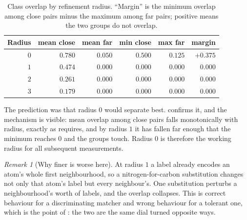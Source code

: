 \documentclass[11pt,twocolumn,a4paper]{article}
\theoremstyle{scthm}
\theoremstyle{definition}
\theoremstyle{remark}
\newtheorem{remark}[theorem]{Remark}
\begin{document}
\begin{table}[htbp]
\centering\small
\caption{Class overlap by refinement radius. ``Margin'' is the minimum
overlap among \textsf{close} pairs minus the maximum among \textsf{far}
pairs; positive means the two groups do not overlap.}
\label{tab:sweep}
\begin{tabular}{@{}rrrrrr@{}}
\toprule
Radius & mean close & mean far & min close & max far & margin\\
\midrule
$0$ & $0.780$ & $0.050$ & $0.500$ & $0.125$ & $+0.375$\\
$1$ & $0.474$ & $0.000$ & $0.000$ & $0.000$ & $\phantom{+}0.000$\\
$2$ & $0.261$ & $0.000$ & $0.000$ & $0.000$ & $\phantom{+}0.000$\\
$3$ & $0.179$ & $0.000$ & $0.000$ & $0.000$ & $\phantom{+}0.000$\\
\bottomrule
\end{tabular}
\end{table}

The prediction was that radius $0$ would separate best.
 confirms it, and the mechanism is visible: mean overlap
among \textsf{close} pairs falls monotonically with radius, exactly as
 requires, and by radius $1$ it has fallen far
enough that the minimum reaches $0$ and the groups touch. Radius $0$ is
therefore the working radius for all subsequent measurements.

\begin{remark}[Why finer is worse here]
\label{rem:finer-worse}
At radius $1$ a label already encodes an atom's whole first
neighbourhood, so a nitrogen-for-carbon substitution changes not only that
atom's label but every neighbour's. One substitution perturbs a
neighbourhood's worth of labels, and the overlap collapses. This is
correct behaviour for a discriminating matcher and wrong behaviour for a
tolerant one, which is the point of : the two are
the same dial turned opposite ways.
\end{remark}
\end{document}
